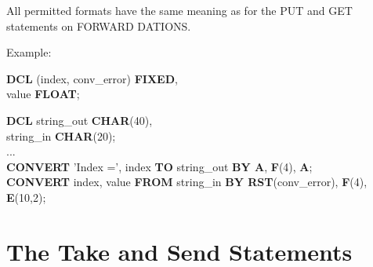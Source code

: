All permitted formats have the same meaning as for the PUT and GET
statements 
on FORWARD DATIONS.

Example:

\begin{tabbing}
{\bf DCL} (index, conv\_error) \= {\bf FIXED},\\
\x        value                \> {\bf FLOAT};\\
\end{tabbing}

{\bf DCL} string\_out {\bf CHAR}(40),\\
\x string\_in {\bf CHAR}(20);\\
...\\
{\bf CONVERT} 'Index =', index {\bf TO} string\_out 
    {\bf BY A}, {\bf F}(4), {\bf A};\\
{\bf CONVERT} index, value {\bf FROM} string\_in {\bf BY RST}(conv\_error), {\bf F}(4), {\bf E}(10,2);


\section{The Take and Send Statements}    %
\label{sec_take_send}

